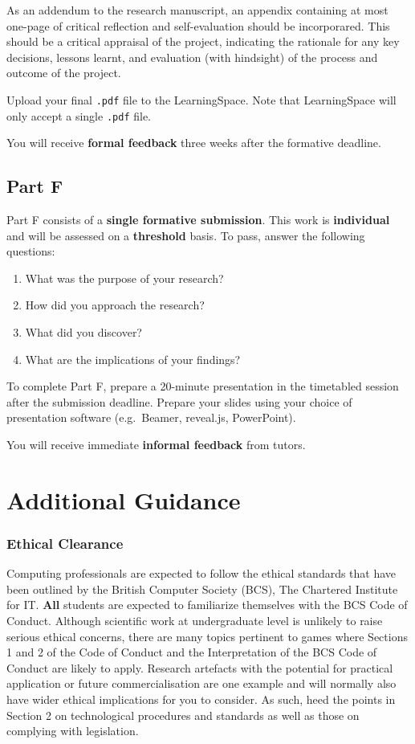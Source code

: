 \documentclass{../fal_assignment}
\begin{document}
As an addendum to the research manuscript, an appendix containing at most one-page of critical reflection and self-evaluation should be incorporared. 
This should be a critical appraisal of the project, indicating the rationale for any key decisions, lessons learnt, and evaluation (with hindsight) of the process
and outcome of the project. 

Upload your final \texttt{.pdf} file to the LearningSpace.
Note that LearningSpace will only accept a single \texttt{.pdf} file.

You will receive \textbf{formal feedback} three weeks after the formative deadline.

\subsection*{Part F}

Part F consists of a \textbf{single formative submission}.
This work is \textbf{individual} and will be assessed on a \textbf{threshold} basis.
To pass, answer the following questions:

\begin{enumerate}[label=(\roman*)]
	\item What was the purpose of your research?
	\item How did you approach the research?
	\item What did you discover?
	\item What are the implications of your findings?
\end{enumerate}

To complete Part F, prepare a 20-minute presentation in the timetabled session after the submission deadline.
Prepare your slides using your choice of presentation software (e.g.\ Beamer, reveal.js, PowerPoint).

You will receive immediate \textbf{informal feedback} from tutors.

\section*{Additional Guidance}

\subsubsection*{Ethical Clearance}

Computing professionals are expected to follow the ethical standards that have been outlined by the British Computer Society (BCS), The Chartered Institute for IT. \textbf{All} students are expected to familiarize themselves with the BCS Code of Conduct. Although scientific work at undergraduate level is unlikely to raise serious ethical concerns, there are many topics pertinent to games where Sections 1 and 2 of the Code of Conduct and the Interpretation of the BCS Code of Conduct are likely to apply. Research artefacts with the potential for practical application or future commercialisation are one example and will normally also have wider ethical implications for you to consider. As such, heed the points in Section 2 on technological procedures and standards as well as those on complying with legislation.
\end{document}
